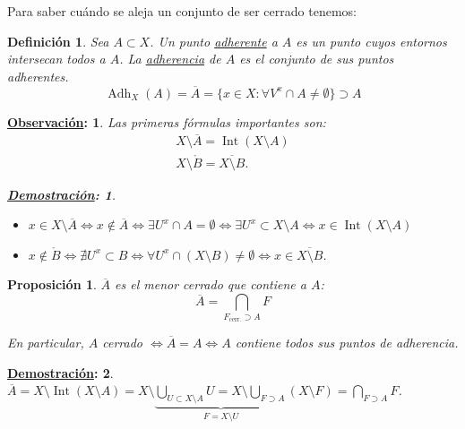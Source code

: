 \documentclass[10pt,a4paper,openright]{book}
\theoremstyle{break}
\newtheorem*{defi}{Definición}
\newtheorem*{prop}{Proposición}
\newtheorem*{demo}{\underline{Demostración}:}
\newtheorem*{obs}{\underline{Observación}:}
\DeclareMathOperator{\inter}{Int}
\DeclareMathOperator{\adh}{Adh}
\begin{document}
Para saber cuándo se aleja un conjunto de ser cerrado tenemos:
\begin{defi}
Sea $A \subset X$. Un punto \underline{adherente} a $A$ es un punto cuyos entornos intersecan todos a $A$. La \underline{adherencia} de $A$ es el conjunto de sus puntos adherentes. 
\[
\adh_X\left( A \right) = \overline{A} = \{x \in X: \forall V^x \cap A \neq \emptyset\} \supset A
\]
\end{defi}

\begin{obs}
Las primeras fórmulas importantes son:
\begin{gather*}
    \boxed{X \setminus \overline{A} = \inter\left( X \setminus A \right)} \\
    \boxed{X \setminus \mathring{B} = \overline{X \setminus B}} 
.\end{gather*}
\begin{demo}
\begin{itemize}
    \item $x \in X \setminus \overline{A} \Leftrightarrow x \not\in \overline{A} \Leftrightarrow \exists U^x \cap A = \emptyset \Leftrightarrow \exists U^x \subset X \setminus A \Leftrightarrow x \in \inter\left( X \setminus A \right)$
    \item $x \not\in \mathring{B} \Leftrightarrow \nexists U^x \subset B \Leftrightarrow \forall U^x \cap \left( X \setminus B \right) \neq \emptyset \Leftrightarrow x \in \overline{X \setminus B}$.
\end{itemize}
\end{demo}
\end{obs}

\begin{prop}
$\overline{A}$ es el menor cerrado que contiene a $A$: 
\[
    \boxed{\overline{A} = \bigcap_{F_{\text{cerr.}} \supset A} F } 
\]

En particular, $A$ cerrado $\Leftrightarrow \overline{A} = A \Leftrightarrow A$ contiene todos sus puntos de adherencia.
\end{prop}
\begin{demo}
$\overline{A} = X \setminus \inter\left( X \setminus A \right) = X \setminus \underbrace{\bigcup_{U \subset X \setminus A} U = X \setminus \bigcup_{F \supset A}}_{F = X \setminus U} \left( X \setminus F \right) = \bigcap_{F \supset A} F$.
\end{demo}
\end{document}
